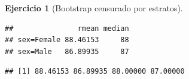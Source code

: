 \documentclass[
]{book}
\newenvironment{Shaded}{\begin{snugshade}}{\end{snugshade}}
\newcommand{\FunctionTok}[1]{\textcolor[rgb]{0.13,0.29,0.53}{\textbf{#1}}}
\newcommand{\NormalTok}[1]{#1}
\newcommand{\SpecialCharTok}[1]{\textcolor[rgb]{0.81,0.36,0.00}{\textbf{#1}}}
\newcommand{\StringTok}[1]{\textcolor[rgb]{0.31,0.60,0.02}{#1}}
\theoremstyle{break}
\newtheorem{exercise}{Ejercicio}[chapter]
\theoremstyle{nonumberplain}
\begin{document}
\begin{exercise}[Bootstrap censurado por estratos]
\begin{verbatim}
##               rmean median
## sex=Female 88.46153     88
## sex=Male   86.89935     87
\end{verbatim}

\begin{Shaded}
\end{Shaded}

\begin{verbatim}
## [1] 88.46153 86.89935 88.00000 87.00000
\end{verbatim}

\end{exercise}
\end{document}
